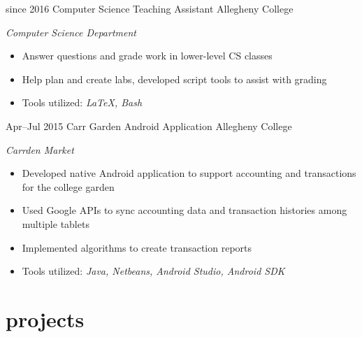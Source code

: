 \documentclass[]{friggeri-cv}
\begin{document}
\begin{entrylist}
  \entry
    {since 2016}
    {Computer Science Teaching Assistant}
    {Allegheny College}
    {\emph{Computer Science Department}
    \begin{itemize}[leftmargin=1.2em]
    \item Answer questions and grade work in lower-level CS classes
    \item Help plan and create labs, developed script tools to assist with grading
    \item Tools utilized: \emph{\LaTeX , Bash}
    \end{itemize}}
  \entry
    {Apr--Jul 2015}
    {Carr Garden Android Application}
    {Allegheny College}
    {\emph{Carrden Market}
    \begin{itemize}[leftmargin=1.2em]
    \item Developed native Android application to support accounting and transactions for the college garden
    \item Used Google APIs to sync accounting data and transaction histories among multiple tablets
    \item Implemented algorithms to create transaction reports
    \item Tools utilized: \emph{Java, Netbeans, Android Studio, Android SDK}
    \end{itemize}}
\end{entrylist}

\section{projects}
\end{document}
